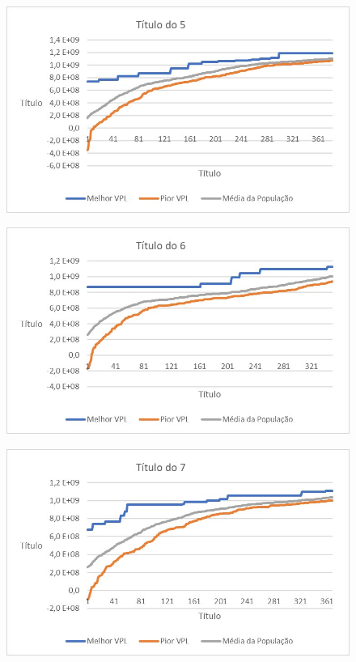 \documentclass[12pt,a4paper]{report}
\begin{document}
\begin{figure}[H]
\centering

\includegraphics[scale=1]{ApE/AGRPCO2/5}

\end{figure}

\begin{figure}[H]
\centering

\includegraphics[scale=1]{ApE/AGRPCO2/6}

\end{figure}

\begin{figure}[H]
\centering

\includegraphics[scale=1]{ApE/AGRPCO2/7}

\end{figure}
\end{document}
